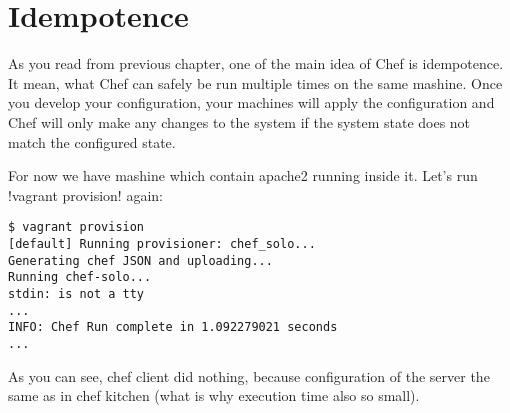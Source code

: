 \section{Idempotence}
\label{sec:solo-idempotence}

As you read from previous chapter, one of the main idea of Chef is idempotence. It mean, what Chef can safely be run multiple times on the same mashine. Once you develop your configuration, your machines will apply the configuration and Chef will only make any changes to the system if the system state does not match the configured state.

For now we have mashine which contain apache2 running inside it. Let's run \inline!vagrant provision! again:

\begin{lstlisting}[label=lst:my-cloud-idempotence1]
$ vagrant provision
[default] Running provisioner: chef_solo...
Generating chef JSON and uploading...
Running chef-solo...
stdin: is not a tty
...
INFO: Chef Run complete in 1.092279021 seconds
...
\end{lstlisting}

As you can see, chef client did nothing, because configuration of the server the same as in chef kitchen (what is why execution time also so small).
